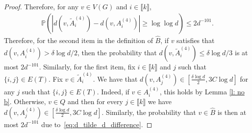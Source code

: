 \documentclass[notitlepage]{scrartcl}
\newcommand{\br}[1]{\llbracket{#1}\rrbracket}
\begin{document}
\begin{proof}
Therefore, for any $v\in V(G)$ and $i\in \br{k}$, 
\begin{align}
\mathbb{P}\left(\left|d(v,\tilde{A}_i^{(4)})-d(v,A_i^{(4)})\right|\ge\log\log d\right)\le 2d^{-101}.
\label{eq:d_tilde_d_difference}
\end{align}
Therefore, for the second item in the definition of $\hat{B}$, if $v$ satisfies that $d(v,A_i^{(4)})>\delta \log d/2$, then the probability that $d(v,\tilde{A}_i^{(4)})\le \delta\log d/3$ is at most $2d^{-101}$. Similarly, for the first item, fix $i\in \br{k}$ and $j$ such that $\{i,j\}\in E(T)$. Fix $v\in \tilde{A}_i^{(4)}$. We have that $d(v, A_j^{(4)})\in \left[\frac{\delta\log d}{2},3C\log d\right]$ for any $j$ such that $\{i,j\}\in E(T)$. Indeed, if $v\in A_i^{(4)}$, this holds by Lemma \ref{l: no b}. Otherwise, $v\in Q$ and then for every $j\in \br{k}$ we have $d(v,A_j^{(4)})\in \left[\frac{\delta\log d}{2},3C\log d\right]$. Similarly, the probability that $v\in \hat{B}$ is then at most $2d^{-101}$ due to~\eqref{eq:d_tilde_d_difference}.
\end{proof}
\end{document}

